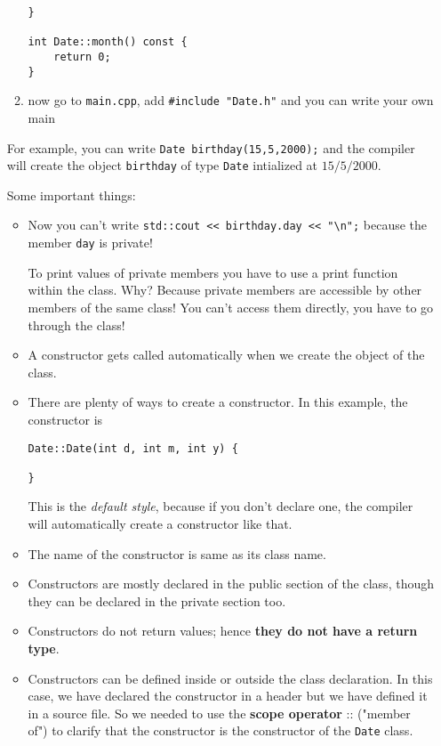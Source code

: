 \begin{enumerate}[$\triangleright$]
\begin{enumerate}
\begin{lstlisting}
}

int Date::month() const {
    return 0;
}
\end{lstlisting}
        \item now go to \texttt{main.cpp}, add \lstinline|#include "Date.h"| and you can write your own main
    \end{enumerate}

    For example, you can write \lstinline|Date birthday(15,5,2000);| and the compiler will create the object \texttt{birthday} of type \texttt{Date} intialized at $15/5/2000$.

    Some important things:
    \begin{itemize}
        \item Now you can't write \lstinline|std::cout << birthday.day << "\n";| because the member \texttt{day} is private!

        \begin{marker}
        To print values of private members you have to use a print function within the class. Why? Because private members are accessible by other members of the same class! You can't access them directly, you have to go through the class!
        \end{marker}

        \item A constructor gets called automatically when we create the object of the class.

        \item There are plenty of ways to create a constructor. In this example, the constructor is
        \begin{lstlisting}
Date::Date(int d, int m, int y) {

}
\end{lstlisting}

        This is the \emph{default style}, because if you don't declare one, the compiler will automatically create a constructor like that.

        \item The name of the constructor is same as its class name.

        \item Constructors are mostly declared in the public section of the class, though they can be declared in the private section too.

        \item Constructors do not return values; hence \textbf{they do not have a return type}.

        \item Constructors can be defined inside or outside the class declaration. In this case, we have declared the constructor in a header but we have defined it in a source file. So we needed to use the \textbf{scope operator} :: ("member of") to clarify that the constructor is the constructor of the \texttt{Date} class.


\end{itemize}
\end{enumerate}
